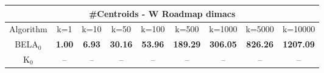\begin{tabular}{c|cccccccc}\toprule
\multicolumn{9}{c}{#Centroids - W Roadmap dimacs}\\ \midrule
Algorithm & k=1 & k=10 & k=50 & k=100 & k=500 & k=1000 & k=5000 & k=10000 \\ \midrule
BELA$_0$ & \textbf{1.00} & \textbf{6.93} & \textbf{30.16} & \textbf{53.96} & \textbf{189.29} & \textbf{306.05} & \textbf{826.26} & \textbf{1207.09} \\
K$_0$ & -- & -- & -- & -- & -- & -- & -- & -- \\ \bottomrule 
\end{tabular}
